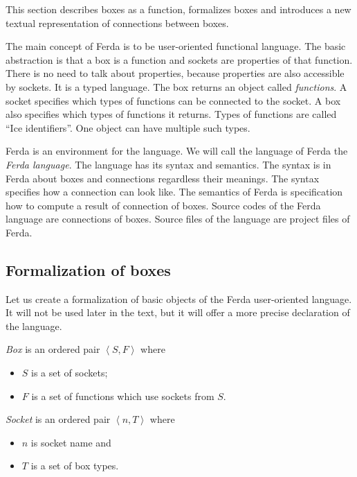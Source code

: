 \documentclass[a4paper,12pt]{book}
\begin{document}
This section describes boxes as a function, formalizes boxes and introduces a new textual representation of connections between boxes.

The main concept of Ferda is to be user-oriented functional language. The basic abstraction is that a box is a function and sockets are properties of that function. There is no need to talk about properties, because properties are also accessible by sockets. It is a typed language. The box returns an object called \emph{functions}. A socket specifies which types of functions can be connected to the socket. A box also specifies which types of functions it returns. Types of functions are called ``Ice identifiers''. One object can have multiple such types.

Ferda is an environment for the language. We will call the language of Ferda the \emph{Ferda language}. The language has its syntax and semantics. The syntax is in Ferda about boxes and connections regardless their meanings. The syntax specifies how a connection can look like. The semantics of Ferda is specification how to compute a result of connection of boxes. Source codes of the Ferda language are connections of boxes. Source files of the language are project files of Ferda.

\subsection{Formalization of boxes}
Let us create a formalization of basic objects of the Ferda user-oriented language. It will not be used later in the text, but it will offer a more precise declaration of the language.

\begin{mydef}
\emph{Box} is an ordered pair $\left<S,F\right>$ where
\begin{itemize}
	\item $S$ is a set of sockets;
	\item $F$ is a set of functions which use sockets from $S$.
\end{itemize}
\end{mydef}

\begin{mydef}
\emph{Socket} is an ordered pair $\left<n,T\right>$ where
\begin{itemize}
	\item $n$ is socket name and
	\item $T$ is a set of box types.
\end{itemize}
\end{mydef}
\end{document}

